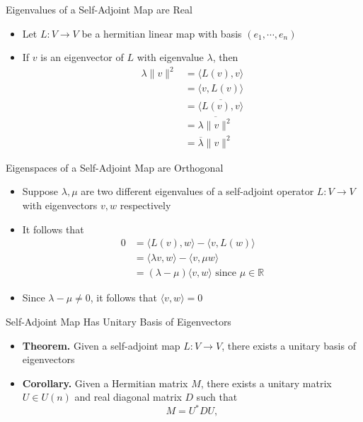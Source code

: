\documentclass[usenames,dvipsnames,10pt]{beamer}
\newcommand{\R}{\mathbb{R}}
\begin{document}
\begin{frame}
  {Eigenvalues of a Self-Adjoint Map are Real}

  \begin{itemize}
  \item Let $L: V \rightarrow V$ be a hermitian linear map with basis $(e_1, \cdots, e_n)$
  \item If $v$ is an eigenvector of $L$ with eigenvalue $\lambda$, then 
    \begin{align*}
      \lambda \|v \|^2 &= \langle L(v),v\rangle\\
                       &= \langle v, L(v)\rangle\\
                       &= \overline{\langle L(v),v\rangle}\\
                       &= \overline{\lambda\|v\|^2}\\
                       &= \overline{\lambda}\|v\|^2
    \end{align*}
  \end{itemize}
\end{frame}

\begin{frame}
  {Eigenspaces of a Self-Adjoint Map are Orthogonal}

  \begin{itemize}
  \item Suppose $\lambda, \mu$ are two different eigenvalues of a self-adjoint operator $L: V \rightarrow V$ with eigenvectors $v, w$ respectively
  \item It follows that
    \begin{align*}
      0 &= \langle L(v),w\rangle -\langle v, L(w)\rangle\\
        &= \langle \lambda v,w\rangle - \langle v, \mu w\rangle\\
        &= (\lambda-\mu)\langle v,w\rangle\text{ since }\mu \in \R
    \end{align*}
  \item Since $\lambda-\mu \ne 0$, it follows that $\langle v,w\rangle = 0$
  \end{itemize}
\end{frame}

\begin{frame}
  {Self-Adjoint Map Has Unitary Basis of Eigenvectors}

  \begin{itemize}
  \item {\bf Theorem.} Given a self-adjoint map $L: V\rightarrow V$, there exists a unitary basis of eigenvectors
  \item {\bf Corollary.} Given a Hermitian matrix $M$, there exists a unitary matrix $U \in U(n)$ and real diagonal matrix $D$ such that
    \[
      M = U^*DU,
    \]
  \end{itemize}
\end{frame}
\end{document}
